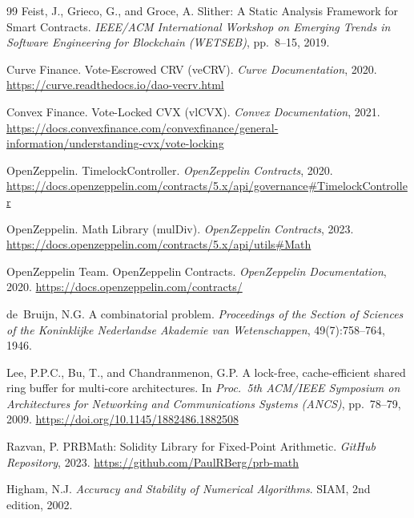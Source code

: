\begin{thebibliography}{99}
Feist, J., Grieco, G., and Groce, A.
\newblock Slither: A Static Analysis Framework for Smart Contracts.
\newblock \emph{IEEE/ACM International Workshop on Emerging Trends in Software Engineering for Blockchain (WETSEB)}, pp.~8--15, 2019.


Curve Finance.
\newblock Vote-Escrowed CRV (veCRV).
\newblock \emph{Curve Documentation}, 2020.
\newblock \url{https://curve.readthedocs.io/dao-vecrv.html}

Convex Finance.
\newblock Vote-Locked CVX (vlCVX).
\newblock \emph{Convex Documentation}, 2021.
\newblock \url{https://docs.convexfinance.com/convexfinance/general-information/understanding-cvx/vote-locking}

OpenZeppelin.
\newblock TimelockController.
\newblock \emph{OpenZeppelin Contracts}, 2020.
\newblock \url{https://docs.openzeppelin.com/contracts/5.x/api/governance#TimelockController}

OpenZeppelin.
\newblock Math Library (mulDiv).
\newblock \emph{OpenZeppelin Contracts}, 2023.
\newblock \url{https://docs.openzeppelin.com/contracts/5.x/api/utils#Math}

OpenZeppelin Team.
\newblock OpenZeppelin Contracts.
\newblock \emph{OpenZeppelin Documentation}, 2020.
\newblock \url{https://docs.openzeppelin.com/contracts/}

de~Bruijn, N.G.
\newblock A combinatorial problem.
\newblock \emph{Proceedings of the Section of Sciences of the Koninklijke Nederlandse Akademie van Wetenschappen}, 49(7):758--764, 1946.

Lee, P.P.C., Bu, T., and Chandranmenon, G.P.
\newblock A lock-free, cache-efficient shared ring buffer for multi-core architectures.
\newblock In \emph{Proc.\ 5th ACM/IEEE Symposium on Architectures for Networking and Communications Systems (ANCS)}, pp.\ 78--79, 2009.
\newblock \url{https://doi.org/10.1145/1882486.1882508}


Razvan, P.
\newblock PRBMath: Solidity Library for Fixed-Point Arithmetic.
\newblock \emph{GitHub Repository}, 2023.
\newblock \url{https://github.com/PaulRBerg/prb-math}

Higham, N.J.
\newblock \emph{Accuracy and Stability of Numerical Algorithms}.
\newblock SIAM, 2nd edition, 2002.


\end{thebibliography}

